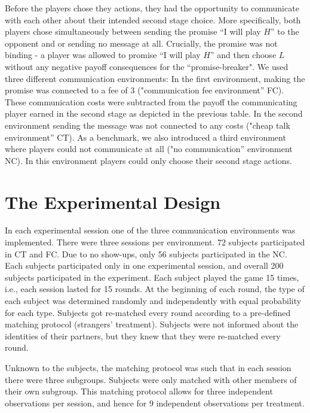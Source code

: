 \documentclass[12pt]{article}
\theoremstyle{break}
\begin{document}
\newline
%
Before the players chose they actions, they had the opportunity to communicate with each other about their intended second stage choice. More specifically, both players chose simultaneously between sending the promise ``I will play $H$'' to the opponent and or sending no message at all. Crucially, the promise was not binding - a player was allowed to promise ``I will play $H$'' and then choose $L$ without any negative payoff consequences for the ``promise-breaker". 
We used three different communication environments: In the first environment, making the promise was connected to a fee of 3 ("communication fee environment'' FC). These communication costs were subtracted from the payoff the communicating player earned in the second stage as depicted in the previous table. 
In the second environment sending the message was not connected to any costs ("cheap talk environment'' CT).
As a benchmark, we also introduced a third environment where players could not communicate at all ("no communication'' environment NC). In this environment players could only choose their second stage actions.

\section{The Experimental Design}

In each experimental session one of the three communication environments was implemented. There were three sessions per environment. 72 subjects participated in CT and FC. Due to no show-ups, only 56 subjects participated in the NC. Each subjects participated only in one experimental session, and overall 200 subjects participated in the experiment.
Each subject played the game 15 times, i.e., each session lasted for 15 rounds. At the beginning of each round, the type of each subject was determined randomly and independently with equal probability for each type. Subjects got re-matched every round according to a pre-defined matching protocol (strangers' treatment). Subjects were not informed about the identities of their partners, but they knew that they were re-matched every round. 

Unknown to the subjects, the matching protocol was such that in each session there were three subgroups. Subjects were only matched with other members of their own subgroup. This matching protocol allows for three independent observations per session, and hence for 9 independent observations per treatment. 
\end{document}
